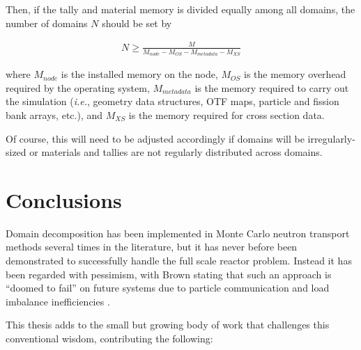 \documentclass[12pt,twoside]{mitthesis-exec}
\begin{document}
Then, if the tally and material memory is divided equally among all domains, the
number of domains $N$ should be set by

\begin{equation}
  \begin{aligned}
    N \ge \frac{M}{M_{node} - M_{OS} - M_{metadata} - M_{XS}}
  \end{aligned}
  \label{eqn:mem_req}
\end{equation}

\noindent where $M_{node}$ is the installed memory on the node, $M_{OS}$ is the
memory overhead required by the operating system, $M_{metadata}$ is the memory
required to carry out the simulation (\emph{i.e.}, geometry data structures, OTF
maps, particle and fission bank arrays, etc.), and $M_{XS}$ is the memory
required for cross section data.

Of course, this will need to be adjusted accordingly if domains will be
irregularly-sized or materials and tallies are not regularly distributed across
domains.

\newpage
\section*{Conclusions}

Domain decomposition has been implemented in Monte Carlo neutron transport
methods several times in the literature, but it has never before been
demonstrated to successfully handle the full scale reactor problem. Instead it
has been regarded with pessimism, with Brown stating that such an approach is
``doomed to fail'' on future systems due to particle communication and load
imbalance inefficiencies \cite{forrest_mc_prospects}.

This thesis adds to the small but growing body of work that challenges this
conventional wisdom, contributing the following:
\end{document}
